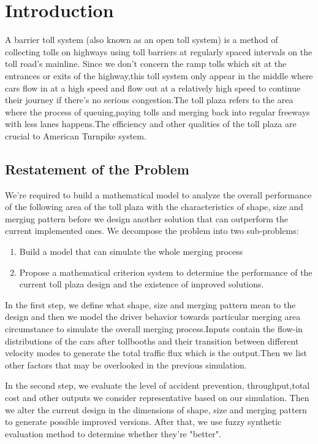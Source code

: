 
\tableofcontents
\newpage

\section{Introduction}
A barrier toll system (also known as an open toll system) is a method of collecting tolls on highways using toll barriers at regularly spaced intervals on the toll road's mainline. Since we don't concern the ramp tolls which sit at the entrances or exits of the highway,this toll system only appear in the middle where cars flow in at a high speed and flow out at a relatively high speed to continue their journey if there's no serious congestion.The toll plaza refers to the area where the process of queuing,paying tolls and merging back into regular freeways with less lanes  happens.The efficiency and other qualities of the toll plaza are crucial to American Turnpike system.
\subsection{Restatement of the Problem}
We're required to build a mathematical model to analyze the overall performance of the following area of the toll plaza with the characteristics of shape, size and merging pattern before we design another solution that can outperform the current implemented ones. We decompose the problem into two sub-problems:
\begin{enumerate}[(1)]
\item
Build a model that can simulate the whole merging process
\item 
Propose a mathematical criterion system to determine the performance of the current toll plaza design and the existence of improved solutions. 
\end{enumerate}

In the first step, we define what shape, size and merging pattern mean to the design and then we model the driver behavior towards particular merging area circumstance to simulate the overall merging process.Inputs contain the flow-in distributions of the cars after tollbooths and their transition between different velocity modes to generate the total traffic flux which is the output.Then we list other factors that may be overlooked in the previous simulation.

In the second step, we evaluate the level of accident prevention, throughput,total cost and other outputs we consider representative based on our simulation. Then we alter the current design in the dimensions of shape, size and merging pattern to generate possible improved versions. After that, we use fuzzy synthetic evaluation method to determine whether they're "better".

